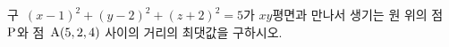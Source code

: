 구~$(x-1)^2+(y-2)^2+(z+2)^2=5$가 $xy$평면과 만나서 생기는 원 위의 점~$\mathrm{P}$와 점~$\mathrm{A}(5{,}\mkern3mu\mathopen{}2{,}\mkern3mu\mathopen{}4)$ 사이의 거리의 최댓값을 구하시오.
